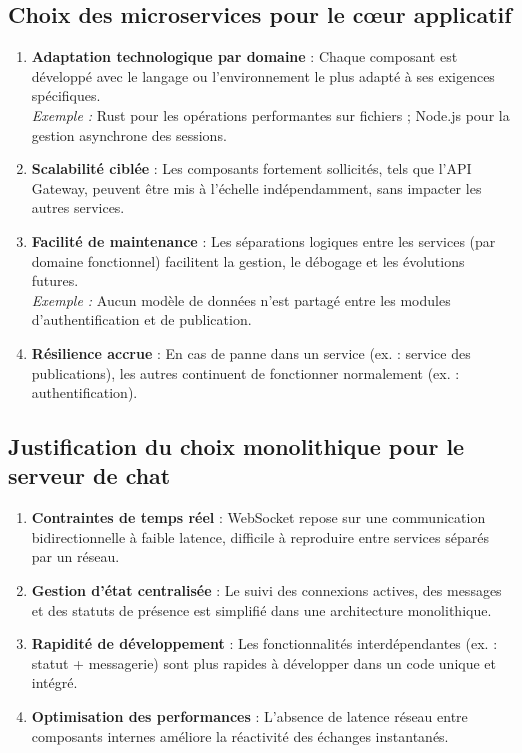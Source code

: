 \documentclass{rapportPfe}
\begin{document}
\subsection{Choix des microservices pour le cœur applicatif}

\begin{enumerate}
    \item \textbf{Adaptation technologique par domaine} : Chaque composant est développé avec le langage ou l’environnement le plus adapté à ses exigences spécifiques. \\
    \textit{Exemple :} Rust pour les opérations performantes sur fichiers ; Node.js pour la gestion asynchrone des sessions.
    
    \item \textbf{Scalabilité ciblée} : Les composants fortement sollicités, tels que l’API Gateway, peuvent être mis à l’échelle indépendamment, sans impacter les autres services.
    
    \item \textbf{Facilité de maintenance} : Les séparations logiques entre les services (par domaine fonctionnel) facilitent la gestion, le débogage et les évolutions futures.\\
    \textit{Exemple :} Aucun modèle de données n’est partagé entre les modules d’authentification et de publication.
    
    \item \textbf{Résilience accrue} : En cas de panne dans un service (ex. : service des publications), les autres continuent de fonctionner normalement (ex. : authentification).
\end{enumerate}

\subsection{Justification du choix monolithique pour le serveur de chat}

\begin{enumerate}
    \item \textbf{Contraintes de temps réel} : WebSocket repose sur une communication bidirectionnelle à faible latence, difficile à reproduire entre services séparés par un réseau.
    
    \item \textbf{Gestion d’état centralisée} : Le suivi des connexions actives, des messages et des statuts de présence est simplifié dans une architecture monolithique.
    
    \item \textbf{Rapidité de développement} : Les fonctionnalités interdépendantes (ex. : statut + messagerie) sont plus rapides à développer dans un code unique et intégré.
    
    \item \textbf{Optimisation des performances} : L’absence de latence réseau entre composants internes améliore la réactivité des échanges instantanés.
\end{enumerate}
\end{document}
